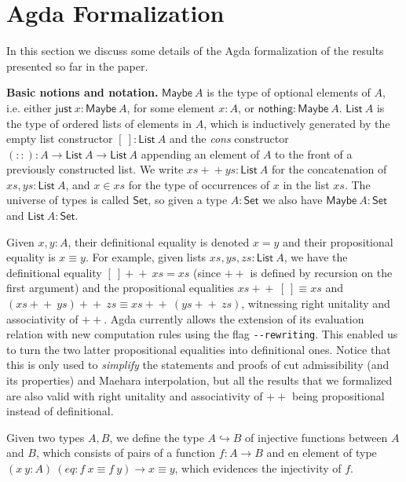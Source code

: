 \documentclass[sn-mathphys-num]{sn-jnl}%
\newcommand{\List}{\mathsf{List}}
\newcommand{\Maybe}{\mathsf{Maybe}}
\newcommand{\nothing}{\mathsf{nothing}}
\newcommand{\just}{\mathsf{just}}
\newcommand{\append}{+\!\!+}
\newcommand{\Set}{\mathsf{Set}}
\theoremstyle{thmstyleone}%
\theoremstyle{thmstyletwo}%
\theoremstyle{thmstylethree}%
\begin{document}
\section{Agda Formalization}\label{sec:agda}

In this section we discuss some details of the Agda formalization of the results presented so far in the paper. 


\noindent\textbf{Basic notions and notation.} $\Maybe ~A$ is the type of optional elements of $A$, i.e. either $\just ~x : \Maybe ~A$, for some element $x : A$, or $\nothing : \Maybe ~A$.
$\List ~A$ is the type of ordered lists of elements in $A$, which is inductively generated by the empty list constructor $[~] : \List ~A$ and the \emph{cons} constructor $(::) : A \to \List ~A \to \List ~A$ appending an element of $A$ to the front of a previously constructed list.
We write $xs +\!\!+ ys : \List ~A$ for the concatenation of $xs, ys : \List ~A$, and $x \in xs$ for the type of occurrences of $x$ in the list $xs$.
The universe of types is called $\Set$, so given a type $A : \Set$ we also have $\Maybe ~A : \Set$ and $\List ~A : \Set$.

Given $x,y : A$, their definitional equality is denoted $x = y$ and their propositional equality is $x \equiv y$.
For example, given lists $xs,ys,zs : \List ~A$, we have the definitional equality $[~] \append~ xs = xs$ (since $\append$ is defined by recursion on the first argument) and the propositional equalities $xs \append ~[~] \equiv xs$ and $(xs \append ~ys) \append ~zs \equiv xs \append ~(ys \append ~zs)$, witnessing right unitality and associativity of $\append$.
Agda currently allows the extension of its evaluation relation with new computation rules using the flag \verb+--rewriting+.
This enabled us to turn the two latter propositional equalities into definitional ones. Notice that this is only used to \emph{simplify} the statements and proofs of cut admissibility (and its properties) and Maehara interpolation, but all the results that we  formalized are also valid with right unitality and associativity of $\append$ being propositional instead of definitional.

Given two types $A,B$, we define the type $A \hookrightarrow B$ of injective functions between $A$ and $B$, which consists of pairs of a function $f : A \to B$  and en element of type $(x ~y : A) ~(eq : f~x \equiv f ~y) \to x \equiv y$, which evidences the injectivity of $f$.
\end{document}
